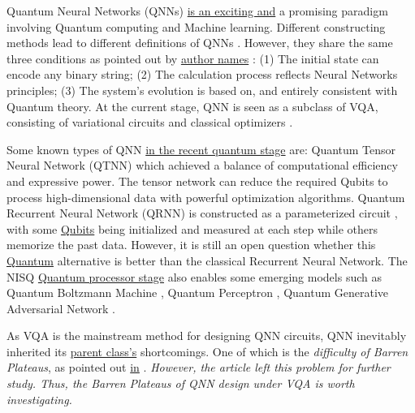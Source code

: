 Quantum Neural Networks (QNNs) \cite{altaisky2001quantum} \underline{is an exciting and} a promising paradigm involving Quantum computing and Machine learning. 
Different constructing methods lead to different definitions of QNNs \cite{paetznick2013} \cite{zhaoBuildingQuantumNeural2019} \cite{caoQuantumNeuronElementary2017}. 
However, they share the same three conditions as pointed out by \underline{author names} \cite{schuldQuestQuantumNeural2014}: 
(1) The initial state can encode any binary string;
(2) The calculation process reflects Neural Networks principles;
(3) The system's evolution is based on, and entirely consistent with Quantum theory.
At the current stage, QNN is seen as a subclass of VQA, consisting of variational circuits and classical optimizers \cite{abbasPowerQuantumNeural2021}.

Some known types of QNN \underline{in the recent quantum stage} are: 
Quantum Tensor Neural Network (QTNN) \cite{hugginsQuantumMachineLearning2019} which achieved a balance of computational efficiency and expressive power. 
The tensor network can reduce the required Qubits to process high-dimensional data with powerful optimization algorithms.
Quantum Recurrent Neural Network (QRNN) is constructed as a parameterized circuit \cite{takakiLearningTemporalData2021}, with some \underline{Qubits} being initialized and measured at each step while others memorize the past data.
However, it is still an open question whether this \underline{Quantum} alternative is better than the classical Recurrent Neural Network.
The NISQ \underline{Quantum processor stage} also enables some emerging models such as 
Quantum Boltzmann Machine \cite{shinguBoltzmannMachineLearning2021}\cite{zoufalVariationalQuantumBoltzmann2021}, 
Quantum Perceptron \cite{kristensenArtificialSpikingQuantum2021}, 
Quantum Generative Adversarial Network \cite{dallaire-demersQuantumGenerativeAdversarial2018}\cite{lloydQuantumGenerativeAdversarial2018}.

As VQA is the mainstream method for designing QNN circuits, QNN inevitably inherited its \underline{parent class's} shortcomings.
One of which is the \emph{difficulty of Barren Plateaus}, as pointed out \underline{in} \cite{abbasPowerQuantumNeural2021}. \emph{However, the article left this problem for further study. Thus, the Barren Plateaus of QNN design under VQA is worth investigating.}

